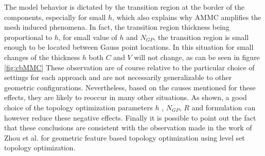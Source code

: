 The model behavior is dictated by the transition region at the border of the components, especially for small $h$, which also explains why AMMC amplifies the mesh induced phenomena. In fact, the transition region thickness being proportional to $h$, for small value of $h$ and $N_{GP}$, the transition region is small enough to be located between Gauss point locations. In this situation for small changes of the thickness $h$ both $C$ and $V$ will not change, as can be seen in figure \ref{fig:cbMMC}
These observation are of course relative to the particular choice of settings for each approach and are not necessarily  generalizable to other geometric configurations. Nevertheless, based on the causes mentioned for these effects, they are likely to reoccur in many other situations. As shown, a good choice of the topology optimization parameters  $h$ , $N_{GP}$, $R$ and formulation can however reduce these negative effects.
 Finally it is possible to point out the fact that these conclusions are consistent with the observation made in the work of Zhou et al. \cite{zhou2016feature} for geometric feature based topology optimization using level set topology optimization.
